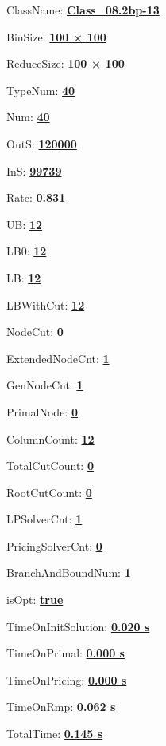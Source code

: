 \documentclass[11pt]{article}
\begin{document}
\pagestyle{empty}


ClassName: \underline{\textbf{Class_08.2bp-13}}
\par
BinSize: \underline{\textbf{100 × 100}}
\par
ReduceSize: \underline{\textbf{100 × 100}}
\par
TypeNum: \underline{\textbf{40}}
\par
Num: \underline{\textbf{40}}
\par
OutS: \underline{\textbf{120000}}
\par
InS: \underline{\textbf{99739}}
\par
Rate: \underline{\textbf{0.831}}
\par
UB: \underline{\textbf{12}}
\par
LB0: \underline{\textbf{12}}
\par
LB: \underline{\textbf{12}}
\par
LBWithCut: \underline{\textbf{12}}
\par
NodeCut: \underline{\textbf{0}}
\par
ExtendedNodeCnt: \underline{\textbf{1}}
\par
GenNodeCnt: \underline{\textbf{1}}
\par
PrimalNode: \underline{\textbf{0}}
\par
ColumnCount: \underline{\textbf{12}}
\par
TotalCutCount: \underline{\textbf{0}}
\par
RootCutCount: \underline{\textbf{0}}
\par
LPSolverCnt: \underline{\textbf{1}}
\par
PricingSolverCnt: \underline{\textbf{0}}
\par
BranchAndBoundNum: \underline{\textbf{1}}
\par
isOpt: \underline{\textbf{true}}
\par
TimeOnInitSolution: \underline{\textbf{0.020 s}}
\par
TimeOnPrimal: \underline{\textbf{0.000 s}}
\par
TimeOnPricing: \underline{\textbf{0.000 s}}
\par
TimeOnRmp: \underline{\textbf{0.062 s}}
\par
TotalTime: \underline{\textbf{0.145 s}}
\par
\newpage


\end{document}

